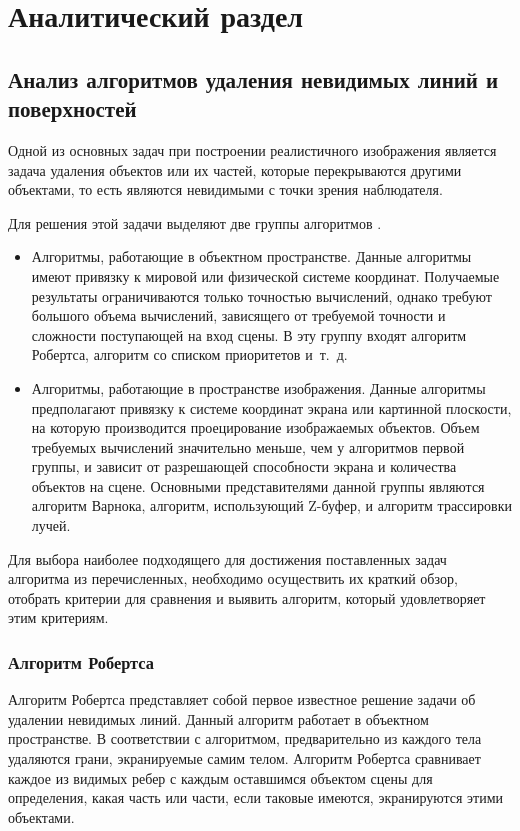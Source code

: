 \chapter{Аналитический раздел}

\section{Анализ алгоритмов удаления невидимых линий и поверхностей}

Одной из основных задач при построении реалистичного изображения является задача удаления объектов или их частей, которые перекрываются другими объектами, то есть являются невидимыми с точки зрения наблюдателя.

Для решения этой задачи выделяют две группы алгоритмов \cite{Rogers}.
\begin{itemize}
	\item Алгоритмы, работающие в объектном пространстве.
	Данные алгоритмы имеют привязку к мировой или физической системе координат.
	Получаемые результаты ограничиваются только точностью вычислений, однако требуют большого объема вычислений, зависящего от требуемой точности и сложности поступающей на вход сцены.
	В эту группу входят алгоритм Робертса, алгоритм со списком приоритетов и~т.~д.

	\item Алгоритмы, работающие в пространстве изображения.
	Данные алгоритмы предполагают привязку к системе координат экрана или картинной плоскости, на которую производится проецирование изображаемых объектов.
	Объем требуемых вычислений значительно меньше, чем у алгоритмов первой группы, и зависит от разрешающей способности экрана и количества объектов на сцене.
	Основными представителями данной группы являются алгоритм Варнока, алгоритм, использующий Z-буфер, и алгоритм трассировки лучей. 
\end{itemize}

Для выбора наиболее подходящего для достижения поставленных задач алгоритма из перечисленных, необходимо осуществить их краткий обзор, отобрать критерии для сравнения и выявить алгоритм, который удовлетворяет этим критериям.

\subsection{Алгоритм Робертса}

Алгоритм Робертса представляет собой первое известное решение задачи об удалении невидимых линий.
Данный алгоритм работает в объектном пространстве.
В соответствии с алгоритмом, предварительно из каждого тела удаляются грани, экранируемые самим телом.
Алгоритм Робертса сравнивает каждое из видимых ребер с каждым оставшимся объектом сцены для определения, какая часть или части, если таковые имеются, экранируются этими объектами.

